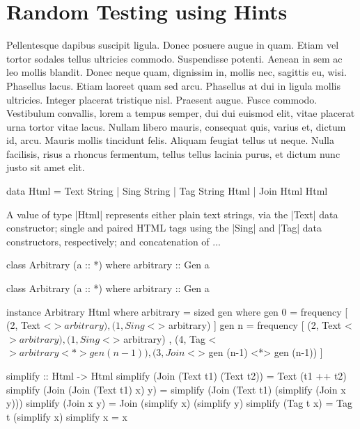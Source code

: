 \section{Random Testing using Hints}
\label{sec:sources}


Pellentesque dapibus suscipit ligula. Donec posuere augue in quam. Etiam vel
tortor sodales tellus ultricies commodo. Suspendisse potenti. Aenean in sem ac
leo mollis blandit. Donec neque quam, dignissim in, mollis nec, sagittis eu,
wisi. Phasellus lacus. Etiam laoreet quam sed arcu. Phasellus at dui in ligula
mollis ultricies. Integer placerat tristique nisl. Praesent augue. Fusce
commodo. Vestibulum convallis, lorem a tempus semper, dui dui euismod elit,
vitae placerat urna tortor vitae lacus. Nullam libero mauris, consequat quis,
varius et, dictum id, arcu. Mauris mollis tincidunt felis. Aliquam feugiat
tellus ut neque. Nulla facilisis, risus a rhoncus fermentum, tellus tellus
lacinia purus, et dictum nunc justo sit amet elit.

\begin{code}
data Html
  =  Text  String
  |  Sing  String
  |  Tag   String Html
  |  Join  Html Html
\end{code}

A value of type |Html| represents either plain text strings, via the |Text| data
constructor; single and paired HTML tags using the |Sing| and |Tag| data
constructors, respectively; and concatenation of ...

\begin{code}
class Arbitrary (a :: *) where
  arbitrary :: Gen a
\end{code}

\begin{code}
class Arbitrary (a :: *) where
  arbitrary :: Gen a
\end{code}

\begin{code}
instance Arbitrary Html where
  arbitrary = sized gen
    where
      gen 0 = frequency
        [  (2,  Text    <$> arbitrary)
        ,  (1,  Sing    <$> arbitrary) ]
      gen n = frequency
        [  (2,  Text    <$> arbitrary)
        ,  (1,  Sing    <$> arbitrary)
        ,  (4,  Tag     <$> arbitrary  <*> gen (n-1))
        ,  (3,  Join    <$> gen (n-1)  <*> gen (n-1)) ]
\end{code} %



\begin{code}
simplify :: Html -> Html
simplify (Join (Text t1) (Text t2))
  = Text (t1 ++ t2)
simplify (Join (Join (Text t1) x) y)
  = simplify (Join (Text t1) (simplify (Join x y)))
simplify (Join x y)
  = Join (simplify x) (simplify y)
simplify (Tag t x)
  = Tag t (simplify x)
simplify x = x
\end{code}
